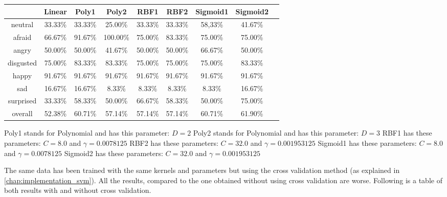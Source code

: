 \vspace{\baselineskip}
\begin {center}
\begin{tabular}{|c|c|c|c|c|c|c|c|c|}
  \hline
    & Linear & Poly1 & Poly2 & RBF1 & RBF2 & Sigmoid1 & Sigmoid2 \\
  \hline
  neutral & 33.33\% & 33.33\% & 25.00\% & 33.33\% & 33.33\% & 58,33\% & 41.67\% \\
  afraid & 66.67\% & 91.67\% & 100.00\% & 75.00\% & 83.33\% & 75.00\% & 75.00\% \\
  angry & 50.00\% & 50.00\% & 41.67\% & 50.00\% & 50.00\% & 66.67\% & 50.00\% \\
  disgusted & 75.00\% & 83.33\% & 83.33\% & 75.00\% & 75.00\% & 75.00\% & 83.33\% \\
  happy & 91.67\% & 91.67\% & 91.67\% & 91.67\% & 91.67\% & 91.67\% & 91.67\% \\
  sad & 16.67\% & 16.67\% & 8.33\% & 8.33\% & 8.33\% & 8.33\% & 16.67\% \\
  surprised & 33.33\% & 58.33\% & 50.00\% & 66.67\% & 58.33\% & 50.00\% & 75.00\% \\
  overall & 52.38\% & 60.71\% & 57.14\% & 57.14\% & 57.14\% & 60.71\% & 61.90\% \\
  \hline
\end{tabular}
\end {center}

\vspace{\baselineskip}
\vspace{\baselineskip}
\noindent Poly1 stands for Polynomial and has this parameter: $ D = 2 $
\newline
\noindent Poly2 stands for Polynomial and has this parameter: $ D = 3 $
\newline
\noindent RBF1 has these parameters: $ C = 8.0 $ and $ \gamma = 0.0078125 $
\newline
\noindent RBF2 has these parameters: $ C = 32.0 $ and $ \gamma = 0.001953125 $ 
\newline
\noindent Sigmoid1 has these parameters: $ C = 8.0 $ and $ \gamma = 0.0078125 $
\newline
\noindent Sigmoid2 has these parameters: $ C = 32.0 $ and $ \gamma = 0.001953125 $
\newline

\noindent The same data has been trained with the same kernels and parameters but using the cross validation method (as explained in \ref{chap:implementation_svm}). All the results, compared to the one obtained without using cross validation are worse. Following is a table of both results with and without cross validation.
\newline

